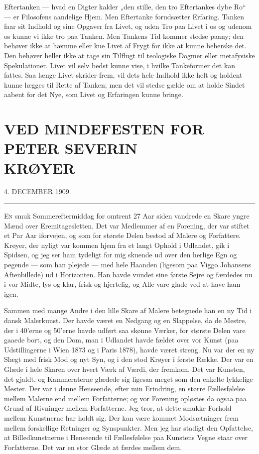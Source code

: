 \documentclass[12pt,a4paper,openany]{book}
\newcommand{\opage}[1]{\marginnote{\footnotesize\textit{[#1]}}}
\newcommand{\essay}[2][]{\chapter*{#2}\addcontentsline{toc}{chapter}{#1}}   %
\newcommand{\undertitel}[1]{\begin{center}\small #1\end{center}}   %
\newcommand{\streg}{\begin{center}\rule{3em}{0.4pt}\end{center}}
\begin{document}
Eftertanken --- hvad en Digter kalder „den stille, den tro
Eftertankes dybe Ro“ --- er Filosofens aandelige Hjem. Men
Eftertanke forudsætter Erfaring. Tanken faar sit Indhold og
sine Opgaver fra Livet, og uden Tro paa Livet i os og udenom
os kunne vi ikke tro paa Tanken. Men Tankens Tid kommer
stedse paany; den behøver ikke at hæmme eller kue Livet af
Frygt for ikke at kunne beherske det. Den behøver heller
ikke at tage sin Tilflugt til teologiske Dogmer eller metafysiske
Spekulationer. Livet vil selv bedst kunne vise, i hvilke Tankeformer
det kan fattes. Saa længe Livet skrider frem, vil dets
hele Indhold ikke helt og holdent kunne lægges til Rette af
Tanken; men det vil stedse gælde om at holde Sindet aabent
for det Nye, som Livet og Erfaringen kunne bringe.

\setcounter{footnote}{0}%
\opage{196}\essay[Ved Mindefesten for Krøyer (1909)]{VED MINDEFESTEN FOR PETER SEVERIN \\ KRØYER}
\undertitel{4. DECEMBER 1909.}
\streg

E\textsc{n} smuk Sommereftermiddag for omtrent 27 Aar siden vandrede
en Skare yngre Mænd over Eremitagesletten. Det
var Medlemmer af en Forening, der var stiftet et Par Aar iforvejen,
og som for største Delen bestod af Malere og Forfattere.
Krøyer, der nyligt var kommen hjem fra et langt Ophold i Udlandet,
gik i Spidsen, og jeg ser ham tydeligt for mig skuende
ud over den herlige Egn og pegende --- som han plejede
--- med hele Haanden (ligesom paa Viggo Johansens Aftenbillede)
ud i Horizonten. Han havde vundet sine første Sejre og færdedes
nu i vor Midte, lys og klar, frisk og hjertelig, og Alle
vare glade ved at have ham igen.

Sammen med mange Andre i den lille Skare af Malere
betegnede han en ny Tid i dansk Malerkunst. Der havde
været en Nedgang og en Slappelse, da de Mestre, der i 40'erne
og 50'erne havde udført saa skønne Værker, for største Delen
vare gaaede bort, og den Dom, man i Udlandet havde fældet
over vor Kunst (paa Udstillingerne i Wien 1873 og i Paris
1878), havde været streng. Nu var der en ny Slægt med
frisk Mod og nyt Syn, og i den stod Krøyer i første Række.
Der var en Glæde i hele Skaren over hvert Værk af Værdi,
der fremkom. Det var Kunsten, det gjaldt, og Kammeraterne
glædede sig ligesaa meget som den enkelte lykkelige Mester.
Der var i denne Henseende, efter min Erindring, en større
Fællesfølelse mellem Malerne end mellem Forfatterne; og vor
Forening opløstes da ogsaa paa Grund af Rivninger mellem
\setcounter{footnote}{0}%
\opage{197}Forfatterne. Jeg tror, at dette smukke Forhold mellem Kunstnerne
har holdt sig. Der kan være kommet Modsætninger
frem mellem forskellige Retninger og Synspunkter. Men jeg
har stadigt den Opfattelse, at Billedkunstnerne i Henseende til
Fællesfølelse paa Kunstens Vegne staar over Forfatterne. Det
var en stor Glæde at færdes mellem dem.
\end{document}
